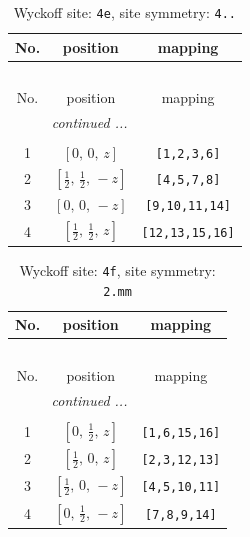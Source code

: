 \documentclass[fleqn,8pt]{jsarticle}
\begin{document}
\begin{longtable}{ccc}
\caption{Wyckoff site: {\tt 4e}, site symmetry: {\tt 4..}}
 \\
 \hline \hline
No. & position & mapping \\ \hline \endfirsthead

\multicolumn{2}{l}{\tablename\ \thetable{}} \\
 \hline \hline
No. & position & mapping \\ \hline \endhead

 \hline \hline
\multicolumn{2}{r}{\footnotesize\it continued ...} \\ \endfoot

 \hline \hline
\multicolumn{2}{r}{} \\ \endlastfoot

1 & $\left[ 0,\, 0,\, z \right]$ & {\tt [1,2,3,6]} \\ \hline
2 & $\left[ \frac{1}{2},\, \frac{1}{2},\, - z \right]$ & {\tt [4,5,7,8]} \\ \hline
3 & $\left[ 0,\, 0,\, - z \right]$ & {\tt [9,10,11,14]} \\ \hline
4 & $\left[ \frac{1}{2},\, \frac{1}{2},\, z \right]$ & {\tt [12,13,15,16]} \\
\end{longtable}
\renewcommand{\arraystretch}{1.2}
\begin{longtable}{ccc}
\caption{Wyckoff site: {\tt 4f}, site symmetry: {\tt 2.mm}}
 \\
 \hline \hline
No. & position & mapping \\ \hline \endfirsthead

\multicolumn{2}{l}{\tablename\ \thetable{}} \\
 \hline \hline
No. & position & mapping \\ \hline \endhead

 \hline \hline
\multicolumn{2}{r}{\footnotesize\it continued ...} \\ \endfoot

 \hline \hline
\multicolumn{2}{r}{} \\ \endlastfoot

1 & $\left[ 0,\, \frac{1}{2},\, z \right]$ & {\tt [1,6,15,16]} \\ \hline
2 & $\left[ \frac{1}{2},\, 0,\, z \right]$ & {\tt [2,3,12,13]} \\ \hline
3 & $\left[ \frac{1}{2},\, 0,\, - z \right]$ & {\tt [4,5,10,11]} \\ \hline
4 & $\left[ 0,\, \frac{1}{2},\, - z \right]$ & {\tt [7,8,9,14]} \\
\end{longtable}
\end{document}
